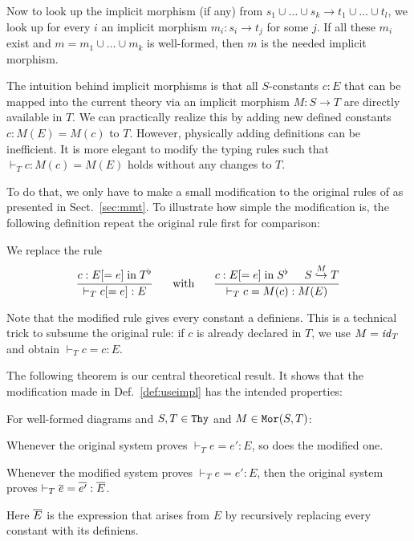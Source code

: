 \begin{union}
\begin{example}
Now to look up the implicit morphism (if any) from $s_1\cup\ldots\cup s_k\to t_1\cup\ldots\cup t_l$, we look up for every $i$ an implicit morphism $m_i:s_i\to t_j$ for some $j$.
If all these $m_i$ exist and $m=m_1\cup \ldots\cup m_k$ is well-formed, then $m$ is the needed implicit morphism.
\end{example}
\end{union}

The intuition behind implicit morphisms is that all $S$-constants $c:E$ that can be mapped into the current theory via an implicit morphism $M:S\to T$ are directly available in $T$.
We can practically realize this by adding new defined constants $c:M(E)=M(c)$ to $T$.
However, physically adding definitions can be inefficient.
It is more elegant to modify the typing rules such that $\vdash_T c:M(c)=M(E)$ holds without any changes to $T$.

To do that, we only have to make a small modification to the original rules of \mmt as presented in Sect.~\ref{sec:mmt}.
To illustrate how simple the modification is, the following definition repeat the original rule first for comparison:

\begin{definition}\label{def:useimpl}
We replace the rule
\[\rul{c:E[=e] \minn \flt{T}}{\vdash_T c[=e]:E} \tb \mwith\tb \rul{c:E[=e] \minn \flt{S}\tb \ipc{M}{S}{T}}{\vdash_T c=M(c):M(E)}\]
\end{definition}

Note that the modified rule gives every constant a definiens.
This is a technical trick to subsume the original rule: if $c$ is already declared in $T$, we use $M=\id{T}$ and obtain $\vdash_T c=c:E$.

The following theorem is our central theoretical result.
It shows that the modification made in Def.~\ref{def:useimpl} has the intended properties:
\begin{theorem}
For well-formed diagrams and $S,T\in\Thy$ and $M\in\Mo{S}{T}$:
\begin{compactenum}
 \item Whenever the original system proves $\vdash_T e=e':E$, so does the modified one.
 \item Whenever the modified system proves $\vdash_T e=e':E$, then the original system proves $\vdash_T \ov{e}=\ov{e'}:\ov{E}$.
\end{compactenum}
Here $\ov{E}$ is the expression that arises from $E$ by recursively replacing every constant with its definiens.
\end{theorem}

